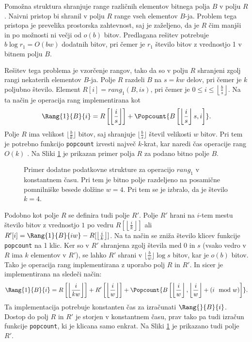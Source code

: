 Pomožna struktura shranjuje range različnih elementov bitnega polja $B$ v polju $R$. Naivni pristop bi shranil v polju $R$ range vseh elementov $B$-ja. Problem tega pristopa je prevelika prostorska zahtevnost, saj je zaželjeno, da je $R$ čim manjši in po možnosti ni večji od $o(b)$ bitov. Predlagana rešitev potrebuje $b\log{r_1}=O(bw)$ dodatnih bitov, pri čemer je $r_1$ število bitov z vrednostjo 1 v bitnem polju $B$.

Rešitev tega problema je vzorčenje rangov, tako da so v polju $R$ shranjeni zgolj rangi nekaterih elementov $B$-ja. Polje $R$ razdeli $B$ na $s=kw$ delov, pri čemer je $k$ poljubno število. Element $R[i]=rang_1(B,is)$, pri čemer je $0\le i \le \left\lfloor\frac{b}{s} \right\rfloor$. Na ta način je operacija rang implementirana kot 
\begin{equation*}
    \Rang{1}{B}{i}=R\left[\left\lfloor\frac{i}{s} \right\rfloor\right] + \Popcount{B\left[\left\lfloor\frac{i}{s} \right\rfloor s,i\right]}.
\end{equation*}
Polje $R$ ima velikost $\lfloor\frac{b}{k}\rfloor$ bitov, saj shranjuje $\lfloor\frac{b}{s}\rfloor$ števil velikosti $w$ bitov. Pri tem je potrebno funkcijo \texttt{popcount} izvesti največ $k$-krat, kar naredi čas operacije rang $O(k)$ \cite{Navarro2016}. Na Sliki \ref{fig:rank} je prikazan primer polja $R$ za podano bitno polje $B$.

\begin{figure}[htb]
    \begin{center}
        
        \caption{Primer dodatne podatkovne strukture za operacijo $rang_1$ v konstantnem času. Pri tem je bitno polje razdeljeno na posamične pomnilniške besede dolžine $w=4$. Pri tem se je izbralo, da je število $k=4$.} 
        \label{fig:rank}
    \end{center}
\end{figure}

Podobno kot polje $R$ se definira tudi polje $R'$. Polje $R'$ hrani na $i$-tem mestu število bitov z vrednostjo $1$ po vedru $R[\left\lfloor\frac{i}{k} \right\rfloor]$ ali $R'[i]=\Rang{1}{B}{iw}-R[\left\lfloor\frac{i}{k} \right\rfloor]$. Na ta način se zniža število klicev funkcije \texttt{popcount} na 1 klic. Ker so v $R'$ shranjena zgolj števila med 0 in $s$ (vsako vedro v $R$ ima $k$ elementov v $R'$), se lahko $R'$ shrani v $\lfloor\frac{b}{w}\rfloor\log{s}$ bitov, kar je $o(b)$ bitov. Tako je operacija rang implementirana z uporabo polj $R$ in $R'$. In sicer je implementirana na sledeči način:
\begin{equation*}
    \Rang{1}{B}{i}=R\left[\left\lfloor\frac{i}{kw} \right\rfloor\right]+ R'\left[\left\lfloor\frac{i}{w} \right\rfloor\right]+\Popcount{B\left[\left\lfloor\frac{i}{w} \right\rfloor,\left\lfloor\frac{i}{w} \right\rfloor+(i \mod w)\right]}.
\end{equation*}
Ta implementacija potrebuje konstanten čas za izračunati $\Rang{}{B}{i}$. Dostop do polj $R$ in $R'$ je storjen v konstantnem času, prav tako pa  tudi izračun funkcije \texttt{popcount}, ki je klicana samo enkrat\cite{Navarro2016}. Na Sliki \ref{fig:rank} je prikazano tudi polje $R'$.


